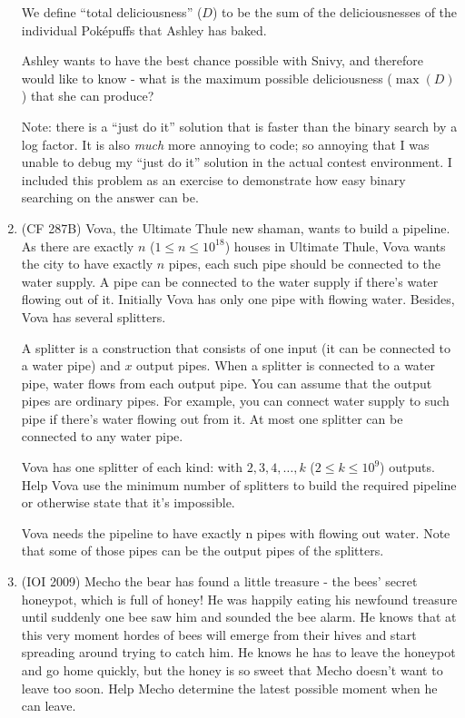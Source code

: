 \documentclass[11pt]{book}
\begin{document}
\begin{enumerate}
We define ``total deliciousness'' ($D$) to be the sum of the deliciousnesses of the individual Poképuffs that Ashley has baked.

Ashley wants to have the best chance possible with Snivy, and therefore would like to know - what is the maximum possible deliciousness ($\max(D)$) that she can produce?

Note: there is a ``just do it'' solution that is faster than the binary search by a log factor. It is also \textit{much} more annoying to code; so annoying that I was unable to debug my ``just do it'' solution in the actual contest environment. I included this problem as an exercise to demonstrate how easy binary searching on the answer can be.

\item
(CF 287B)
Vova, the Ultimate Thule new shaman, wants to build a pipeline. As there are exactly $n$ ($1 \le n \le 10^{18}$) houses in Ultimate Thule, Vova wants the city to have exactly $n$ pipes, each such pipe should be connected to the water supply. A pipe can be connected to the water supply if there's water flowing out of it. Initially Vova has only one pipe with flowing water. Besides, Vova has several splitters.

A splitter is a construction that consists of one input (it can be connected to a water pipe) and $x$ output pipes. When a splitter is connected to a water pipe, water flows from each output pipe. You can assume that the output pipes are ordinary pipes. For example, you can connect water supply to such pipe if there's water flowing out from it. At most one splitter can be connected to any water pipe.

Vova has one splitter of each kind: with $2, 3, 4, \ldots, k$ ($2 \le k \le 10^9$) outputs. Help Vova use the minimum number of splitters to build the required pipeline or otherwise state that it's impossible.

Vova needs the pipeline to have exactly n pipes with flowing out water. Note that some of those pipes can be the output pipes of the splitters.

\item
(IOI 2009)
Mecho the bear has found a little treasure - the bees' secret honeypot, which is full of honey! He was happily eating his newfound treasure until suddenly one bee saw him and sounded the bee alarm. He knows that at this very moment hordes of bees will emerge from their hives and start spreading around trying to catch him. He knows he has to leave the honeypot and go home quickly, but the honey is so sweet that Mecho doesn't want to leave too soon. Help Mecho determine the latest possible moment when he can leave.


\end{enumerate}
\end{document}
